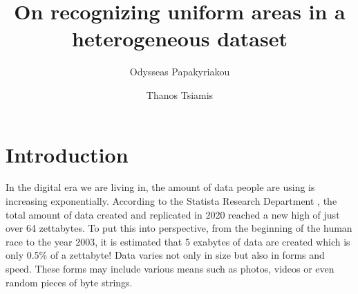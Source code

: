 \documentclass[sigconf]{acmart}
\begin{document}
\title{On recognizing uniform areas in a heterogeneous dataset}

\author{Odysseas Papakyriakou}

\author{Thanos Tsiamis}

\renewcommand{\shortauthors}{Papakyriakou and Tsiamis}

\maketitle
\pagestyle{plain}

\section{Introduction}
In the digital era we are living in, the amount of data people are using is increasing exponentially. According to the Statista Research Department \cite{StatistaAmountofData}, the total amount of data created and replicated in 2020 reached a new high of just over 64 zettabytes. To put this into perspective, from the beginning of the human race to the year 2003, it is estimated that 5 exabytes of data are created \cite{humanRaceDataAmount} which is only 0.5\% of a zettabyte! Data varies not only in size but also in forms and speed. These forms may include various means such as photos, videos or even random pieces of byte strings.
\end{document}
